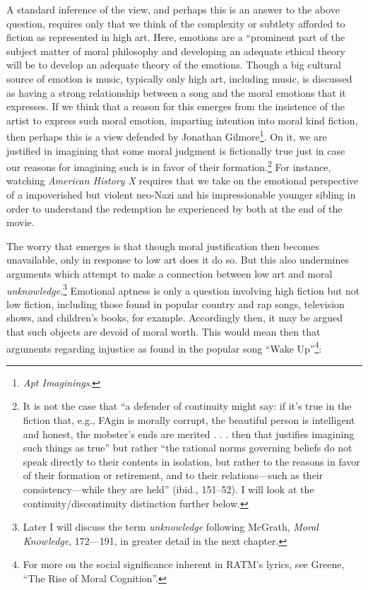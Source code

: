 \documentclass[
  12pt,
]{book}
\theoremstyle{definition}
\theoremstyle{definition}
\theoremstyle{definition}
\theoremstyle{definition}
\theoremstyle{remark}
\begin{document}
A standard inference of the view, and perhaps this is an answer to the above question, requires only that we think of the complexity or subtlety afforded to fiction as represented in high art. Here, emotions are a ``prominent part of the subject matter of moral philosophy and developing an adequate ethical theory will be to develop an adequate theory of the emotions. Though a big cultural source of emotion is music, typically only high art, including music, is discussed as having a strong relationship between a song and the moral emotions that it expresses. If we think that a reason for this emerges from the insistence of the artist to express such moral emotion, imparting intention into moral kind fiction, then perhaps this is a view defended by Jonathan Gilmore\footnote{\emph{Apt {Imaginings}}.}. On it, we are justified in imagining that some moral judgment is fictionally true just in case our reasons for imagining such is in favor of their formation.\footnote{It is not the case that ``a defender of continuity might say: if it's true in the fiction that, e.g., FAgin is morally corrupt, the beautiful person is intelligent and honest, the mobster's ends are merited . . . then that justifies imagining such things as true'' but rather ``the rational norms governing beliefs do not speak directly to their contents in isolation, but rather to the reasons in favor of their formation or retirement, and to their relations---such as their consistency---while they are held'' (ibid., 151--52). I will look at the continuity/discontinuity distinction further below.} For instance, watching \emph{American History X} requires that we take on the emotional perspective of a impoverished but violent neo-Nazi and his impressionable younger sibling in order to understand the redemption he experienced by both at the end of the movie.

The worry that emerges is that though moral justification then becomes unavailable, only in response to low art does it do so. But this also undermines arguments which attempt to make a connection between low art and moral \emph{unknowledge}.\footnote{Later I will discuss the term \emph{unknowledge} following McGrath, \emph{Moral {Knowledge}}, 172---191, in greater detail in the next chapter.} Emotional aptness is only a question involving high fiction but not low fiction, including those found in popular country and rap songs, television shows, and children's books, for example. Accordingly then, it may be argued that such objects are devoid of moral worth. This would mean then that arguments regarding injustice as found in the popular song ``Wake Up''\footnote{For more on the social significance inherent in RATM's lyrics, see Greene, {``The Rise of Moral Cognition''}.}:
\end{document}
